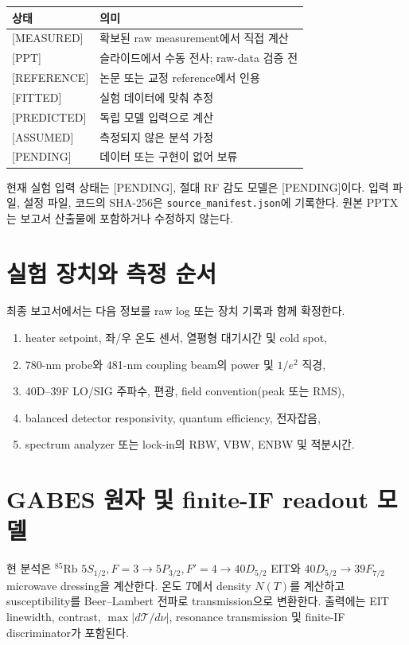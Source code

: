 \documentclass[11pt,a4paper]{article}
\providecommand{\ExperimentalInputStatus}{PENDING}
\providecommand{\AbsoluteSensitivityStatus}{PENDING}
\newcommand{\Status}[1]{\textsf{[#1]}}
\begin{document}
\begin{longtable}{p{}p{}}
\toprule
상태 & 의미\\
\midrule
\Status{MEASURED} & 확보된 raw measurement에서 직접 계산\\
\Status{PPT} & 슬라이드에서 수동 전사; raw-data 검증 전\\
\Status{REFERENCE} & 논문 또는 교정 reference에서 인용\\
\Status{FITTED} & 실험 데이터에 맞춰 추정\\
\Status{PREDICTED} & 독립 모델 입력으로 계산\\
\Status{ASSUMED} & 측정되지 않은 분석 가정\\
\Status{PENDING} & 데이터 또는 구현이 없어 보류\\
\bottomrule
\end{longtable}

현재 실험 입력 상태는 \Status{\ExperimentalInputStatus}, 절대 RF 감도 모델은
\Status{\AbsoluteSensitivityStatus}이다. 입력 파일, 설정 파일, 코드의 SHA-256은
\texttt{source\_manifest.json}에 기록한다. 원본 PPTX는 보고서 산출물에 포함하거나
수정하지 않는다.

\section{실험 장치와 측정 순서}

최종 보고서에서는 다음 정보를 raw log 또는 장치 기록과 함께 확정한다.

\begin{enumerate}
  \item heater setpoint, 좌/우 온도 센서, 열평형 대기시간 및 cold spot,
  \item 780-nm probe와 481-nm coupling beam의 power 및 \(1/e^2\) 직경,
  \item 40D--39F LO/SIG 주파수, 편광, field convention(peak 또는 RMS),
  \item balanced detector responsivity, quantum efficiency, 전자잡음,
  \item spectrum analyzer 또는 lock-in의 RBW, VBW, ENBW 및 적분시간.
\end{enumerate}

\section{GABES 원자 및 finite-IF readout 모델}

현 분석은 \({}^{85}\mathrm{Rb}\)
\(5S_{1/2},F=3\rightarrow5P_{3/2},F'=4\rightarrow40D_{5/2}\) EIT와
\(40D_{5/2}\rightarrow39F_{7/2}\) microwave dressing을 계산한다.
온도 \(T\)에서 density \(N(T)\)를 계산하고 susceptibility를 Beer--Lambert
전파로 transmission으로 변환한다. 출력에는 EIT linewidth, contrast,
\(\max|d\mathcal{T}/d\nu|\), resonance transmission 및 finite-IF discriminator가
포함된다.
\end{document}
